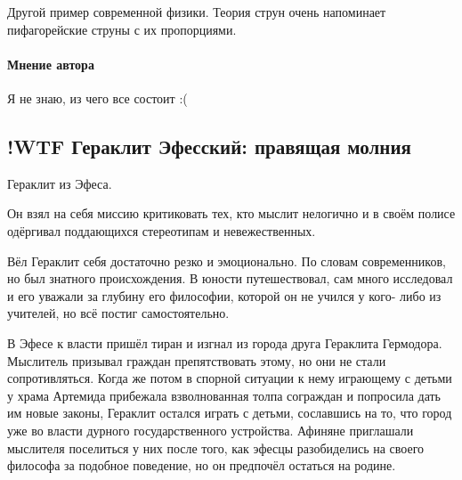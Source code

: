 Другой пример современной физики. Теория струн очень напоминает пифагорейские струны с их пропорциями. 

\paragraph{Мнение автора} Я не знаю, из чего все состоит :(



\subsection{!WTF Гераклит Эфесский: правящая молния}

Гераклит из Эфеса.

Он взял на себя миссию критиковать
тех, кто мыслит нелогично и в своём полисе одёргивал поддающихся стереотипам и
невежественных.

Вёл Гераклит себя достаточно резко и эмоционально. По словам
современников, но был знатного происхождения. В юности путешествовал, сам много
исследовал и его уважали за глубину его философии, которой он не учился у кого-
либо из учителей, но всё постиг самостоятельно. 

В Эфесе к власти пришёл тиран и изгнал из города друга Гераклита Гермодора. Мыслитель призывал граждан препятствовать этому, но они не стали сопротивляться. Когда же потом в спорной ситуации к нему играющему с детьми у храма Артемида прибежала взволнованная
толпа сограждан и попросила дать им новые законы, Гераклит остался играть с
детьми, сославшись на то, что город уже во власти дурного государственного
устройства. Афиняне приглашали мыслителя поселиться у них после того, как эфесцы
разобиделись на своего философа за подобное поведение, но он предпочёл остаться
на родине. 

